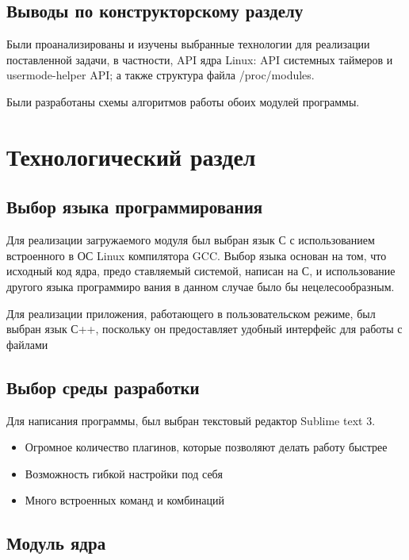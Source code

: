 \documentclass[a4paper,14pt]{extarticle}
\begin{document}
 	\newpage
 	
 	\subsection*{Выводы по конструкторскому разделу}
 	
 	Были проанализированы и изучены выбранные технологии для реализации поставленной задачи, в частности, API ядра Linux: API системных таймеров и usermode-helper API; а также структура файла /proc/modules.
 	
 	Были разработаны схемы алгоритмов работы обоих модулей программы.
 	
 	\newpage
 	
 	\section{Технологический раздел}
 	
 	\subsection{Выбор языка программирования}
 	
 	Для реализации загружаемого модуля был выбран язык С с использованием встроенного в ОС Linux компилятора GCC. Выбор языка основан на том, что исходный код ядра, предо­ ставляемый системой, написан на С, и использование другого языка программиро­ вания в данном случае было бы нецелесообразным.
 	
 	Для реализации приложения, работающего в пользовательском режиме, был выбран язык С++, поскольку он предоставляет удобный интерфейс для работы с файлами
 	
 	\subsection{Выбор среды разработки}
 	
 	Для написания программы, был выбран текстовый редактор Sublime text 3.
 	\begin{itemize}
 		\item Огромное количество плагинов, которые позволяют делать работу быстрее
 		\item Возможность гибкой настройки под себя
 		\item Много встроенных команд и комбинаций
 	\end{itemize}
 
 \newpage
 
 	\subsection{Модуль ядра}
 	
\end{document}
